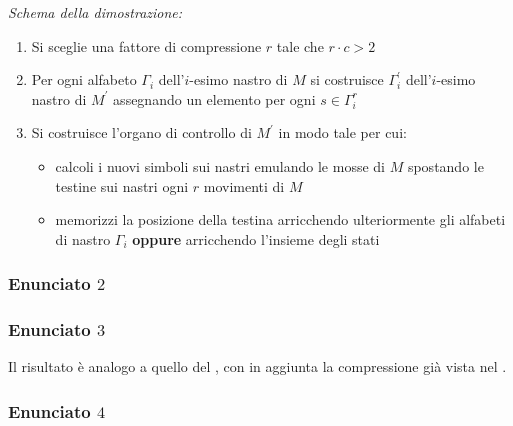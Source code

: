 \documentclass[italian, 10pt]{article}
\begin{document}
\textit{Schema della dimostrazione:}
\begin{enumerate}
  \item Si sceglie una fattore di compressione \(r\) tale che \(r \cdot c > 2\)
  \item Per ogni alfabeto \(\Gamma_i\) dell'\(i\)-esimo nastro di \(M\) si costruisce \(\Gamma^\prime_i\) dell'\(i\)-esimo nastro di \(M^\prime\) assegnando un elemento per ogni \(s \in \Gamma^r_i\)
  \item Si costruisce l'organo di controllo di \(M^\prime\) in modo tale per cui:
        \begin{itemize}
          \item calcoli i nuovi simboli sui nastri emulando le mosse di \(M\) spostando le testine sui nastri ogni \(r\) movimenti di \(M\)
          \item memorizzi la posizione della testina arricchendo ulteriormente gli alfabeti di nastro \(\Gamma_i\) \textbf{oppure} arricchendo l'insieme degli stati
        \end{itemize}
\end{enumerate}

\subsubsection[Enunciato 2]{Enunciato \(2\)}
\label{sec:enunciato-accelerazione-2}


\subsubsection[Enunciato 3]{Enunciato \(3\)}


Il risultato è analogo a quello del , con in aggiunta la compressione già vista nel .

\subsubsection[Enunciato 4]{Enunciato \(4\)}
\end{document}
